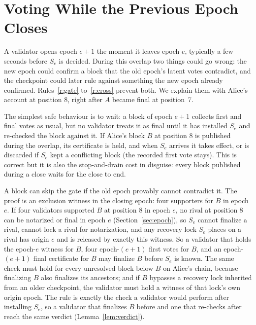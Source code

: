 \section{Voting While the Previous Epoch Closes}
\label{sec:pipeline}
A validator opens epoch $e+1$ the moment it leaves epoch $e$, typically a few seconds before $S_e$ is decided. During this overlap two things could go wrong: the new epoch could confirm a block that the old epoch's latent votes contradict, and the checkpoint could later rule against something the new epoch already confirmed. Rules~\ref{r:gate} to~\ref{r:cross} prevent both. We explain them with Alice's account at position 8, right after $A$ became final at position~7.

The simplest safe behaviour is to wait: a block of epoch $e+1$ collects first and final votes as usual, but no validator treats it as final until it has installed $S_e$ and re-checked the block against it. If Alice's block $B$ at position 8 is published during the overlap, its certificate is held, and when $S_e$ arrives it takes effect, or is discarded if $S_e$ kept a conflicting block (the recorded first vote stays). This is correct but it is also the stop-and-drain cost in disguise: every block published during a close waits for the close to end.

A block can skip the gate if the old epoch provably cannot contradict it. The proof is an exclusion witness in the closing epoch: four supporters for $B$ in epoch $e$. If four validators supported $B$ at position 8 in epoch $e$, no rival at position 8 can be notarized or final in epoch $e$ (Section~\ref{sec:epoch}), so $S_e$ cannot finalize a rival, cannot lock a rival for notarization, and any recovery lock $S_e$ places on a rival has origin $e$ and is released by exactly this witness. So a validator that holds the epoch-$e$ witness for $B$, four epoch-$(e+1)$ first votes for $B$, and an epoch-$(e+1)$ final certificate for $B$ may finalize $B$ before $S_e$ is known. The same check must hold for every unresolved block below $B$ on Alice's chain, because finalizing $B$ also finalizes its ancestors; and if $B$ bypasses a recovery lock inherited from an older checkpoint, the validator must hold a witness of that lock's own origin epoch. The rule is exactly the check a validator would perform after installing $S_e$, so a validator that finalizes $B$ before and one that re-checks after reach the same verdict (Lemma~\ref{lem:verdict}).

